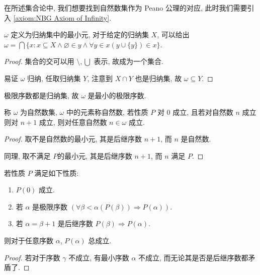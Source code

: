 在所述集合论中, 我们想要找到自然数集作为 Peano 公理的对应, 此时我们需要引入 \ref{axiom:NBG Axiom of Infinity}.

\begin{definition}
    \label{definition:omega}
    \(\omega\) 定义为归纳集中的最小元, 对于给定的归纳集 \(X\), 可以给出 \(\omega = \bigcap \{x : x \subseteq X \land \varnothing \in y \land \forall y \in x (y \cup \{y\}) \in x\}\).

    \begin{proof}
        集合的交可以用 \(\setminus, \bigcup\) 表示, 故成为一个集合.

        易证 \(\omega\) 归纳, 任取归纳集 \(Y\), 注意到 \(X \cap Y\) 也是归纳集, 故 \(\omega \subseteq Y\).
    \end{proof}
\end{definition}

\begin{corollary}
    极限序数都是归纳集, 故 \(\omega\) 是最小的极限序数.
\end{corollary}

\begin{theorem*}[数学归纳法]
    \label{theorem:mathematical induction}
    称 \(\omega\) 为自然数集, \(\omega\) 中的元素称自然数, 若性质 \(P\) 对 \(0\) 成立, 且若对自然数 \(n\) 成立则对 \(n+1\) 成立, 则对任意自然数 \(n \in \omega\) 成立.
    
    \begin{proof}
        取不是自然数的最小元, 其是后继序数 \(n+1\), 而 \(n\) 是自然数.

        同理, 取不满足 \(P\)的最小元, 其是后继序数 \(n+1\), 而 \(n\) 满足 \(P\).
    \end{proof}
\end{theorem*}

\begin{theorem*}[超限归纳法]
    \label{theorem:transfinite induction}
    若性质 \(P\) 满足如下性质:
    \begin{enumerate}
        \item \(P(0)\) 成立.
        \item 若 \(\alpha\) 是极限序数 \((\forall \beta < \alpha (P(\beta)) \Rightarrow P(\alpha))\).
        \item 若 \(\alpha = \beta + 1\) 是后继序数 \(P(\beta) \Rightarrow P(\alpha)\).
    \end{enumerate}

    则对于任意序数 \(\alpha\), \(P(\alpha)\) 总成立.

    \begin{proof}
        若对于序数 \(\gamma\) 不成立, 有最小序数 \(\alpha\) 不成立, 而无论其是否是后继序数都矛盾了.
    \end{proof}
\end{theorem*}

